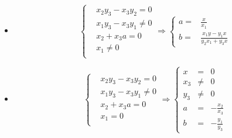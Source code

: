 \documentclass{article}
\begin{document}
\begin{landscape}
\begin{itemize}
        \item 
    
        \begin{equation}
            \left\{
            \begin{aligned}
                & x_2 y_3 - x_3 y_2 = 0 \\
                & x_1 y_3 - x_3 y_1 \neq 0 \\
                & x_2 + x_3 a = 0 \\
                & x_1 \neq 0 \\
            \end{aligned}
            \right.
            \Rightarrow
            \left\{
            \begin{aligned}
                a = & \frac{x}{x_1}\\
                b = & \frac{x_1 y - y_1 x}{y_2 x_1 + y_3 x}     
            \end{aligned}
            \right.
        \end{equation}

        \item 

        \begin{equation}
            \left\{
            \begin{aligned}
                & x_2 y_3 - x_3 y_2 = 0 \\
                & x_1 y_3 - x_3 y_1 \neq 0 \\
                & x_2 + x_3 a = 0 \\
                & x_1 = 0 \\
            \end{aligned}
            \right.
            \Rightarrow
            \left\{
            \begin{aligned}
                x & = & 0 \\
                x_3 &\neq & 0 \\
                y_3 &\neq & 0 \\
                a & = & -\frac{x_2}{x_3}\\
                b & = & -\frac{y_1}{y_3}     
            \end{aligned}
            \right.
        \end{equation}



\end{itemize}
\end{landscape}
\end{document}
